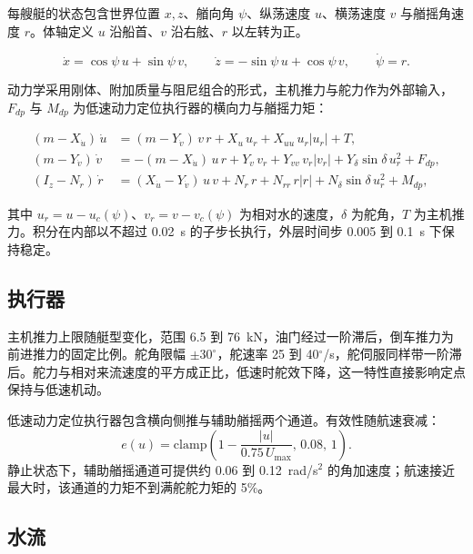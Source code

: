 \documentclass[UTF8, a4paper, 11pt]{ctexart}
\begin{document}
每艘艇的状态包含世界位置 $x,z$、艏向角 $\psi$、纵荡速度 $u$、横荡速度 $v$ 与艏摇角速度 $r$。体轴定义 $u$ 沿船首、$v$ 沿右舷、$r$ 以左转为正。

\begin{equation}
\dot x=\cos\psi\,u+\sin\psi\,v,\qquad
\dot z=-\sin\psi\,u+\cos\psi\,v,\qquad
\dot\psi=r .
\end{equation}

动力学采用刚体、附加质量与阻尼组合的形式，主机推力与舵力作为外部输入，$F_{dp}$ 与 $M_{dp}$ 为低速动力定位执行器的横向力与艏摇力矩：

\begin{equation}
\begin{aligned}
(m-X_{\dot u})\,\dot u &= (m-Y_{\dot v})\,v\,r + X_u\,u_r + X_{uu}\,u_r|u_r| + T,\\
(m-Y_{\dot v})\,\dot v &= -(m-X_{\dot u})\,u\,r + Y_v\,v_r + Y_{vv}\,v_r|v_r| + Y_\delta\sin\delta\,u_r^2 + F_{dp},\\
(I_z-N_{\dot r})\,\dot r &= (X_{\dot u}-Y_{\dot v})\,u\,v + N_r\,r + N_{rr}\,r|r| + N_\delta\sin\delta\,u_r^2 + M_{dp},
\end{aligned}
\label{eq:hydro}
\end{equation}

其中 $u_r=u-u_c(\psi)$、$v_r=v-v_c(\psi)$ 为相对水的速度，$\delta$ 为舵角，$T$ 为主机推力。积分在内部以不超过 0.02~s 的子步长执行，外层时间步 0.005 到 0.1~s 下保持稳定。

\subsection{执行器}

主机推力上限随艇型变化，范围 6.5 到 76~kN，油门经过一阶滞后，倒车推力为前进推力的固定比例。舵角限幅 $\pm30^\circ$，舵速率 25 到 40$^\circ$/s，舵伺服同样带一阶滞后。舵力与相对来流速度的平方成正比，低速时舵效下降，这一特性直接影响定点保持与低速机动。

低速动力定位执行器包含横向侧推与辅助艏摇两个通道。有效性随航速衰减：
\begin{equation}
e(u)=\mathrm{clamp}\!\left(1-\frac{|u|}{0.75\,U_{\max}},\,0.08,\,1\right).
\end{equation}
静止状态下，辅助艏摇通道可提供约 0.06 到 0.12~rad/s$^2$ 的角加速度；航速接近最大时，该通道的力矩不到满舵舵力矩的 5\%。

\subsection{水流}
\end{document}
